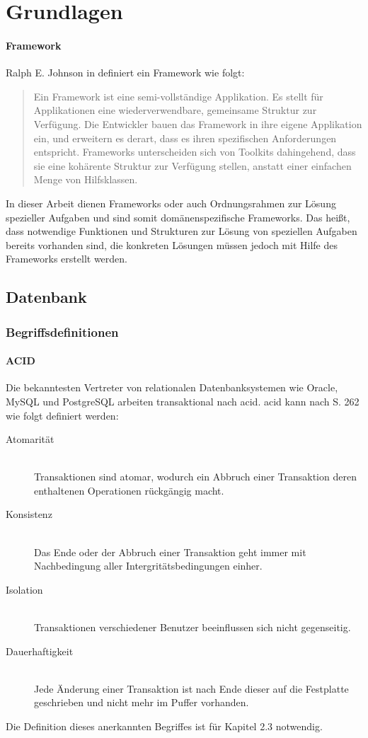 \chapter{Grundlagen}
\label{Grundlagen}

\subsubsection{Framework}
Ralph E. Johnson in \cite{website:wiki-framework} definiert ein Framework wie folgt:
\begin{quote}
Ein Framework ist eine semi-vollständige Applikation. Es stellt für Applikationen eine wiederverwendbare, gemeinsame Struktur zur Verfügung. Die Entwickler bauen das Framework in ihre eigene Applikation ein, und erweitern es derart, dass es ihren spezifischen Anforderungen entspricht. Frameworks unterscheiden sich von Toolkits dahingehend, dass sie eine kohärente Struktur zur Verfügung stellen, anstatt einer einfachen Menge von Hilfsklassen.
\end{quote}
In dieser Arbeit dienen Frameworks oder auch Ordnungsrahmen zur Lösung spezieller Aufgaben und sind somit domänenspezifische Frameworks.
Das heißt, dass notwendige Funktionen und Strukturen zur Lösung von speziellen Aufgaben bereits vorhanden sind, die konkreten Lösungen müssen jedoch mit Hilfe des Frameworks erstellt werden.


\section{Datenbank}

\subsection{Begriffsdefinitionen}

\subsubsection{ACID}
Die bekanntesten Vertreter von relationalen Datenbanksystemen wie Oracle, MySQL und PostgreSQL arbeiten transaktional nach \Gls{acid}.
\Gls{acid} kann nach \cite{book:kudrass} S. 262 wie folgt definiert werden:
\begin{description}
\item[Atomarität] \hfill \\
Transaktionen sind atomar, wodurch ein Abbruch einer Transaktion deren enthaltenen Operationen rückgängig macht.
\item[Konsistenz] \hfill \\
Das Ende oder der Abbruch einer Transaktion geht immer mit Nachbedingung aller Intergritätsbedingungen einher.
\item[Isolation] \hfill \\
Transaktionen verschiedener Benutzer beeinflussen sich nicht gegenseitig.
\item[Dauerhaftigkeit] \hfill \\
Jede Änderung einer Transaktion ist nach Ende dieser auf die Festplatte geschrieben und nicht mehr im Puffer vorhanden.
\end{description}
Die Definition dieses anerkannten Begriffes ist für Kapitel 2.3 notwendig.

